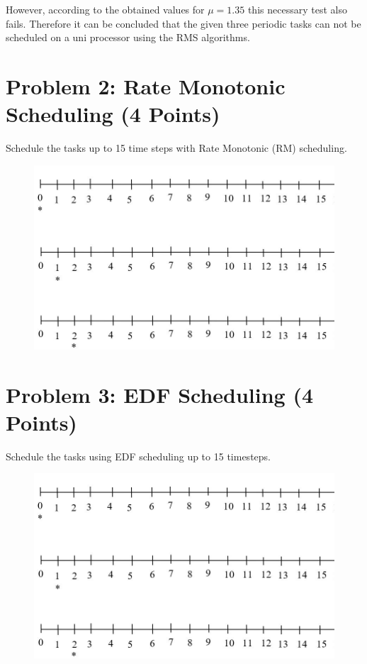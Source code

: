 \documentclass[11pt,letterpaper]{article}
\begin{document}
However, according to the obtained values for $\mu = 1.35$ this necessary test also fails. Therefore it can be concluded that the given three periodic tasks can not be scheduled on  a uni processor using the RMS algorithms.
	\newpage
	\section*{Problem 2: Rate Monotonic Scheduling (4 Points)}
	
	Schedule the tasks up to 15 time steps with Rate Monotonic (RM) scheduling.
	
	\begin{figure}[h]
		\centering
		\includegraphics[width=0.8\columnwidth]{images/assignment4-timesteps.jpg}
	\end{figure}
	
	\newpage
	\section*{Problem 3: EDF Scheduling (4 Points)}
	
	Schedule the tasks using EDF scheduling up to 15 timesteps.
	
	
	\begin{figure}[h]
		\centering
		\includegraphics[width=0.8\columnwidth]{images/assignment4-timesteps.jpg}
	\end{figure}
	
\end{document}

